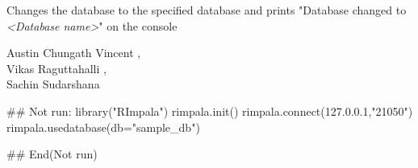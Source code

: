 \documentclass[letterpaper]{book}
\begin{document}
%
\begin{Value}
Changes the database to the specified database and prints "Database changed to \emph{<Database name>}" on the console
\end{Value}
%
\begin{Author}\relax
Austin Chungath Vincent ,\\{}
Vikas Raguttahalli ,\\{}
Sachin Sudarshana 
\end{Author}
%
\begin{Examples}
\begin{ExampleCode}
## Not run: 
library("RImpala")
rimpala.init()
rimpala.connect(127.0.0.1,"21050")
rimpala.usedatabase(db="sample_db")

## End(Not run)
\end{ExampleCode}
\end{Examples}
\printindex{}
\end{document}
